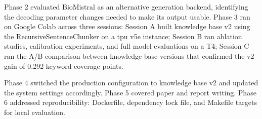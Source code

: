 Phase 2 evaluated BioMistral as an alternative generation backend, identifying the decoding parameter changes needed to make its output usable. Phase 3 ran on Google Colab across three sessions: Session A built knowledge base v2 using the RecursiveSentenceChunker on a \ac{tpu} v5e instance; Session B ran ablation studies, calibration experiments, and full model evaluations on a T4; Session C ran the A/B comparison between knowledge base versions that confirmed the v2 gain of 0.292 keyword coverage points.

Phase 4 switched the production configuration to knowledge base v2 and updated the system settings accordingly. Phase 5 covered paper and report writing. Phase 6 addressed reproducibility: Dockerfile, dependency lock file, and Makefile targets for local evaluation.

